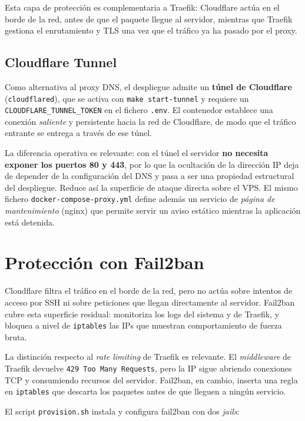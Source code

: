 Esta capa de protección es complementaria a Traefik: Cloudflare actúa en el borde de la red, antes de que el paquete llegue al servidor, mientras que Traefik gestiona el enrutamiento y TLS una vez que el tráfico ya ha pasado por el proxy.

\subsection{Cloudflare Tunnel}

Como alternativa al proxy DNS, el despliegue admite un \textbf{túnel de Cloudflare} (\texttt{cloudflared}), que se activa con \texttt{make start-tunnel} y requiere un \texttt{CLOUDFLARE\_TUNNEL\_TOKEN} en el fichero \texttt{.env}. El contenedor establece una conexión \emph{saliente} y persistente hacia la red de Cloudflare, de modo que el tráfico entrante se entrega a través de ese túnel.

La diferencia operativa es relevante: con el túnel el servidor \textbf{no necesita exponer los puertos 80 y 443}, por lo que la ocultación de la dirección IP deja de depender de la configuración del DNS y pasa a ser una propiedad estructural del despliegue. Reduce así la superficie de ataque directa sobre el VPS. El mismo fichero \texttt{docker-compose-proxy.yml} define además un servicio de \emph{página de mantenimiento} (nginx) que permite servir un aviso estático mientras la aplicación está detenida.

\section{Protección con Fail2ban}

Cloudflare filtra el tráfico en el borde de la red, pero no actúa sobre intentos de acceso por SSH ni sobre peticiones que llegan directamente al servidor. Fail2ban cubre esta superficie residual: monitoriza los logs del sistema y de Traefik, y bloquea a nivel de \texttt{iptables} las IPs que muestran comportamiento de fuerza bruta.

La distinción respecto al \emph{rate limiting} de Traefik es relevante. El \emph{middleware} de Traefik devuelve \texttt{429 Too Many Requests}, pero la IP sigue abriendo conexiones TCP y consumiendo recursos del servidor. Fail2ban, en cambio, inserta una regla en \texttt{iptables} que descarta los paquetes antes de que lleguen a ningún servicio.

El script \texttt{provision.sh} instala y configura fail2ban con dos \emph{jails}:

